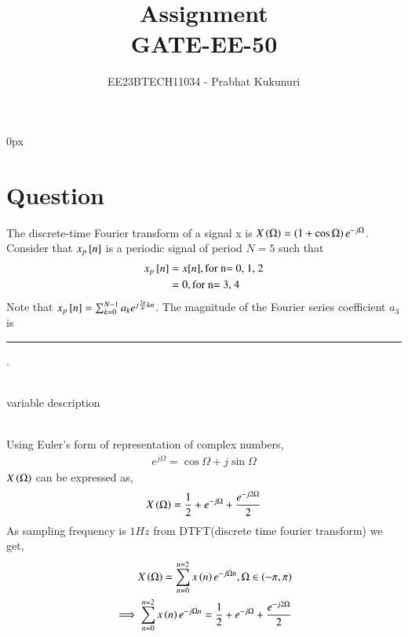 \documentclass[journal,12pt,twocolumn]{IEEEtran}
\theoremstyle{remark}
\begin{document}
\parindent 0px


\vspace{3cm}

\title{Assignment\\[1ex]GATE-EE-50}
\author{EE23BTECH11034 - Prabhat Kukunuri$^{}$%
}
\maketitle
\newpage
\bigskip

\renewcommand{\thefigure}{\theenumi}
\renewcommand{\thetable}{\theenumi}
\section{Question}
The discrete-time Fourier transform of a signal x is $X\left(\Omega\right)=\left(1+\cos{\Omega}\right)e^{-j\Omega}$. Consider that $x_{p}{}\left[n\right]$ is a periodic signal of period $N=5$ such that
\begin{align}
    x_p{}\left[n\right]&=x[n],\text{for n= 0, 1, 2}\\
    &=0,\text{for n= 3, 4}
\end{align}
Note that $x_p{}\left[n\right]=\sum_{k=0}^{N-1}a_{k}e^{j\frac{2\pi}{N}kn}$. The magnitude of the Fourier series coefficient $a_3$ is \rule{3cm}{0.15mm} .\\
\solution\\
\begin{table}[h!]
    \centering
    
    \caption{variable description}
    \label{tab:GATE.2023.EE.50.0}
\end{table}\\
Using Euler's form of representation of complex numbers,
\begin{align}
    e^{j\Omega}=\cos{\Omega}+j\sin{\Omega}
\end{align}
$X\left(\Omega\right)$ can be expressed as,
\begin{align}
    X\left(\Omega\right)=\frac{1}{2}+e^{-j\Omega}+\frac{e^{-j2\Omega}}{2}
\end{align}
As sampling frequency is $1Hz$ \brak{\omega=\Omega} from DTFT(discrete time fourier transform) we get,
\begin{align}
    X\left(\Omega\right)=\sum^{n=2}_{n=0}x\left(n\right)e^{-j\Omega n},   \Omega \in \left(-\pi,\pi\right)\\
    \implies\sum^{n=2}_{n=0}x\left(n\right)e^{-j\Omega n}=\frac{1}{2}+e^{-j\Omega}+\frac{e^{-j2\Omega}}{2}
\end{align}
\end{document}
